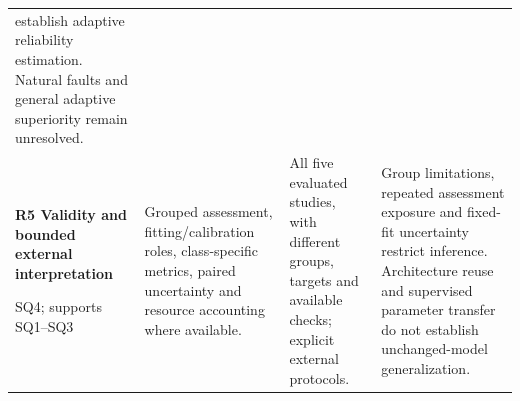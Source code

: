 \begin{tabularx}{\linewidth}{@{}>{\raggedright\arraybackslash}p{73bp}>{\raggedright\arraybackslash}p{111bp}>{\raggedright\arraybackslash}p{100bp}>{\raggedright\arraybackslash}X@{}}
establish adaptive reliability estimation. Natural faults and general adaptive
superiority remain unresolved. \\
\addlinespace[7bp]
\textbf{R5 Validity and bounded external interpretation}\par SQ4; supports SQ1--SQ3 &
Grouped assessment, fitting/calibration roles, class-specific metrics, paired
uncertainty and resource accounting where available. &
All five evaluated studies, with different groups, targets and available checks;
explicit external protocols. &
Group limitations, repeated assessment exposure and fixed-fit uncertainty restrict
inference. Architecture reuse and supervised parameter transfer do not establish
unchanged-model generalization. \\
\bottomrule
\end{tabularx}
\endgroup
